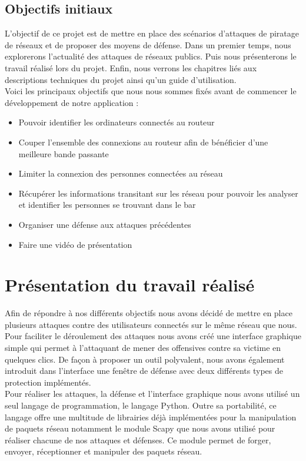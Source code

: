 \documentclass[11pt]{article}
\begin{document}
\subsection{Objectifs initiaux}
L’objectif de ce projet est de mettre en place des scénarios d’attaques de piratage de réseaux et de proposer des moyens de défense. Dans un premier temps, nous explorerons l'actualité des attaques de réseaux publics. Puis nous présenterons le travail réalisé lors du projet. Enfin, nous verrons les chapitres liés aux descriptions techniques du projet ainsi qu'un guide d'utilisation.~\\

Voici les principaux objectifs que nous nous sommes fixés avant de commencer le développement de notre application :

\begin{itemize}
\item Pouvoir identifier les ordinateurs connectés au routeur
\item Couper l’ensemble des connexions au routeur afin de bénéficier d’une meilleure bande passante
\item Limiter la connexion des personnes connectées au réseau
\item Récupérer les informations transitant sur les réseau pour pouvoir les analyser et identifier les personnes se trouvant dans le bar
\item Organiser une défense aux attaques précédentes
\item Faire une vidéo de présentation 
\end{itemize}

\section{Présentation du travail réalisé}
Afin de répondre à nos différents objectifs nous avons décidé de mettre en place plusieurs attaques contre des utilisateurs connectés sur le même réseau que nous. Pour faciliter le déroulement des attaques nous avons créé une interface graphique simple qui permet à l'attaquant de mener des offensives contre sa victime en quelques clics. De façon à proposer un outil polyvalent, nous avons également introduit dans l'interface une fenêtre de défense avec deux différents types de protection implémentés. ~\\

Pour réaliser les attaques, la défense et l'interface graphique nous avons utilisé un seul langage de programmation, le langage Python. Outre sa portabilité, ce langage offre une multitude de librairies déjà implémentées pour la manipulation de paquets réseau notamment le module Scapy que nous avons utilisé pour réaliser chacune de nos attaques et défenses. Ce module permet de forger, envoyer, réceptionner et manipuler des paquets réseau.~\\
\end{document}
